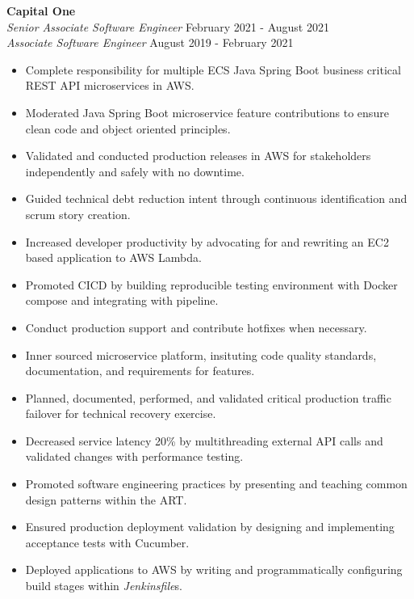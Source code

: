 \documentclass[overlapped]{res}
\begin{document}
\begin{resume}
\textbf{Capital One}  \\
{\sl Senior Associate Software Engineer} \hfill February 2021 - August 2021 \\
{\sl Associate Software Engineer} \hfill August 2019 - February 2021
\begin{itemize}  \itemsep -2pt %
    \item Complete responsibility for multiple ECS Java Spring Boot business critical REST API microservices in AWS.
    \item Moderated Java Spring Boot microservice feature contributions to ensure clean code and object oriented principles.  %
    \item Validated and conducted production releases in AWS for stakeholders independently and safely with no downtime.
    \item Guided technical debt reduction intent through continuous identification and scrum story creation.
    \item Increased developer productivity by advocating for and rewriting an EC2 based application to AWS Lambda.
    \item Promoted CICD by building reproducible testing environment with Docker compose and integrating with pipeline.
    \item Conduct production support and contribute hotfixes when necessary.
    \item Inner sourced microservice platform, insituting code quality standards, documentation, and requirements for features.
    \item Planned, documented, performed, and validated critical production traffic failover for technical recovery exercise. 
    \item Decreased service latency 20\% by multithreading external
    API calls and validated changes with performance testing.
    \item Promoted software engineering practices by presenting and teaching common design patterns within the ART. 
    \item Ensured production deployment validation by designing 
    and implementing acceptance tests with Cucumber.
    \item Deployed applications to AWS by
    writing and programmatically configuring build stages within {\it Jenkinsfile}s.

\end{itemize}
\end{resume}
\end{document}
